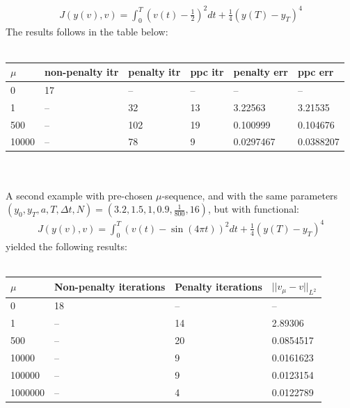 \documentclass[11pt,a4paper]{article}
\begin{document}
\begin{align*}
J(y(v),v)=\int_0^T (v(t)-\frac{1}{2})^2 dt + \frac{1}{4}(y(T)-y_T)^4
\end{align*}  
The results follows in the table below:
\\
\\
\begin{tabular}{llllll}
\toprule
{} $\mu$& non-penalty itr & penalty itr & ppc itr & penalty err &    ppc err \\
\midrule
0     &              17 &          -- &      -- &          -- &         -- \\
1     &              -- &          32 &      13 &     3.22563 &    3.21535 \\
500   &              -- &         102 &      19 &    0.100999 &   0.104676 \\
10000 &              -- &          78 &       9 &   0.0297467 &  0.0388207 \\
\bottomrule
\end{tabular}
\\
\\
A second example with pre-chosen $\mu$-sequence, and with the same parameters $(y_0,y_T,a,T,\Delta t,N)=(3.2,1.5,1,0.9,\frac{1}{800},16)$, but with functional:
\begin{align*}
J(y(v),v)=\int_0^T (v(t)-\sin(4\pi t))^2 dt + \frac{1}{4}(y(T)-y_T)^4
\end{align*}
yielded the following results:
\\
\\
\begin{tabular}{llll}
\toprule
{} $\mu$& Non-penalty iterations & Penalty iterations & $||v_{\mu}-v||_{L^2}$ \\
\midrule
0       &                     18 &                 -- &            -- \\
1       &                     -- &                 14 &       2.89306 \\
500     &                     -- &                 20 &     0.0854517 \\
10000   &                     -- &                  9 &     0.0161623 \\
100000  &                     -- &                  9 &     0.0123154 \\
1000000 &                     -- &                  4 &     0.0122789 \\
\bottomrule
\end{tabular}
\end{document}
